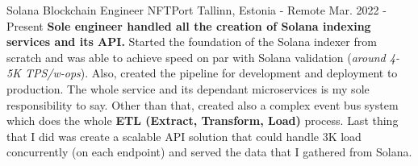
\begin{cventries}
    \cventry
        {Solana Blockchain Engineer}
        {NFTPort}
        {Tallinn, Estonia - Remote}
        {Mar. 2022 - Present}
        {\textbf{Sole engineer handled all the creation of Solana indexing services and its API.}\newline
        Started the foundation of the Solana indexer from scratch and was able to achieve speed on par with Solana validation (\emph{around 4-5K TPS/w-ops}). Also, created the pipeline for development and deployment to production. The whole service and its dependant microservices is my sole responsibility to say. Other than that, created also a complex event bus system which does the whole \textbf{ETL (Extract, Transform, Load)} process. Last thing that I did was create a scalable API solution that could handle 3K load concurrently (on each endpoint) and served the data that I gathered from Solana.}


\end{cventries}
